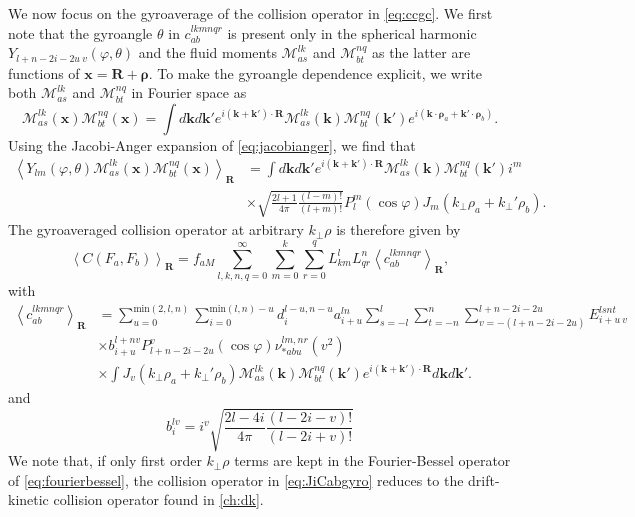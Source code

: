 We now focus on the gyroaverage of the collision operator in \cref{eq:ccgc}.
%
We first note that the gyroangle $\theta$ in $c^{lkmnqr}_{ab}$ is present only in the spherical harmonic $ Y_{l+n-2i-2u~v}(\varphi,\theta)$ and the fluid moments $\mathcal{M}^{lk}_{as}$ and $\mathcal{M}^{nq}_{bt}$ as the latter are functions of $\mathbf x = \mathbf R + \mathbf \rho$.
%
To make the gyroangle dependence explicit, we write both $\mathcal{M}^{lk}_{as}$ and $\mathcal{M}^{nq}_{bt}$ in Fourier space as
%
\begin{equation}
    \mathcal{M}^{lk}_{as}(\mathbf x)\mathcal{M}^{nq}_{bt}(\mathbf x) = \int d\mathbf k d \mathbf k' e^{i(\mathbf k + \mathbf k')\cdot \mathbf R}\mathcal{M}^{lk}_{as}(\mathbf k)\mathcal{M}^{nq}_{bt}(\mathbf k')e^{i(\mathbf k \cdot \mathbf \rho_a + \mathbf k'\cdot \mathbf \rho_b)}.
\label{eq:Fouriermoment}
\end{equation}
%
Using the Jacobi-Anger expansion of \cref{eq:jacobianger}, we find that
%
\begin{align}
    \left<Y_{lm}(\varphi,\theta)\mathcal{M}^{lk}_{as}(\mathbf x)\mathcal{M}^{nq}_{bt}(\mathbf x)\right>_{\mathbf R}&=\int d\mathbf k d \mathbf k' e^{i(\mathbf k + \mathbf k')\cdot \mathbf R}\mathcal{M}^{lk}_{as}(\mathbf k)\mathcal{M}^{nq}_{bt}(\mathbf k') i^m\nonumber\\
    &\times\sqrt{\frac{2l+1}{4\pi}\frac{(l-m)!}{(l+m)!}}P_l^m(\cos \varphi)J_m(k_\perp \rho_a + k_\perp' \rho_b).
\end{align}
%
The gyroaveraged collision operator at arbitrary $k_\perp \rho$ is therefore given by
%
\begin{equation}
    \left<C(F_a,F_b)\right>_{\mathbf R}=f_{aM}\sum_{l,k,n,q=0}^\infty\sum_{m=0}^k\sum_{r=0}^{q}{L_{km}^lL_{qr}^n} \left<c^{lkmnqr}_{ab}\right>_{\mathbf R},
    \label{eq:JiCabgyro}
\end{equation}
%
with
%
\begin{align}
    \left<c^{lkmnqr}_{ab}\right>_{\mathbf R}&=\sum_{u=0}^{\text{min}(2,l,n)}\sum_{i=0}^{\text{min}(l,n)-u}d_i^{l-u,n-u}a^{ln}_{i+u}\sum_{s=-l}^l\sum_{t=-n}^n \sum_{v=-(l+n-2i-2u)}^{l+n-2i-2u} E^{ls nt}_{i+u~v}\nonumber\\
    &\times b_{i+u}^{l+n v} P_{l+n-2i-2u}^v(\cos \varphi){\nu_{*abu}^{lm,nr}(v^2)} \nonumber\\
    &\times \int J_v(k_\perp \rho_a + k_\perp' \rho_b)\mathcal{M}^{lk}_{as}(\mathbf k)\mathcal{M}^{nq}_{bt}(\mathbf k')e^{i(\mathbf k +\mathbf k')\cdot \mathbf R}d \mathbf k d\mathbf k'.
    \label{eq:ccgcgyro}
\end{align}
%
and
%
\begin{equation}
    b_{i}^{lv}=i^v\sqrt{\frac{2l-4i}{4\pi}\frac{(l-2i-v)!}{(l-2i+v)!}}
\end{equation}
%
We note that, if only first order $k_\perp \rho$ terms are kept in the Fourier-Bessel operator of \cref{eq:fourierbessel}, the collision operator in \cref{eq:JiCabgyro} reduces to the drift-kinetic collision operator found in \cref{ch:dk}.

